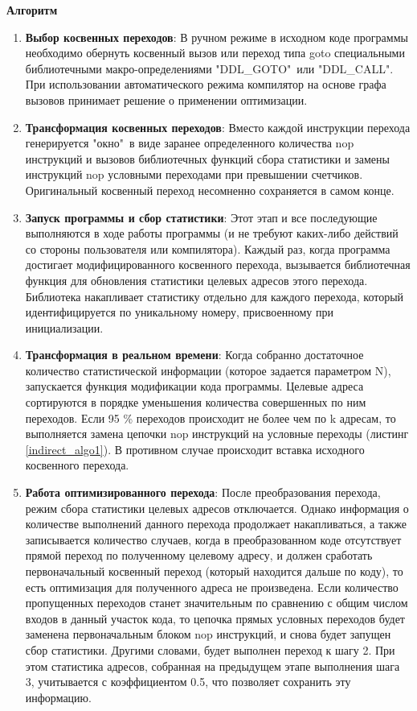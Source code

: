 \textbf{Алгоритм}
 \begin{enumerate}
 	\item \textbf{Выбор косвенных переходов}: В ручном режиме в исходном коде программы  необходимо обернуть косвенный вызов или переход типа goto специальными библиотечными макро-определениями "DDL\_GOTO"\  или "DDL\_CALL". При использовании автоматического режима компилятор на основе графа вызовов принимает решение о применении оптимизации. 
 	\item \textbf{Трансформация косвенных переходов}: Вместо каждой инструкции перехода генерируется "окно"\  в виде заранее определенного количества nop инструкций и вызовов библиотечных функций сбора статистики и замены инструкций nop условными переходами при превышении счетчиков. Оригинальный косвенный переход несомненно сохраняется в самом конце.
 	\item \textbf{Запуск программы и сбор статистики}: Этот этап и все последующие  выполняются в ходе работы программы (и не требуют каких-либо действий со стороны пользователя или компилятора). Каждый раз, когда программа достигает модифицированного косвенного перехода, вызывается библиотечная функция для обновления статистики целевых адресов этого перехода. Библиотека  накапливает статистику отдельно для каждого перехода, который идентифицируется по уникальному номеру, присвоенному при инициализации.
 	\item \textbf{Трансформация в реальном времени}: Когда собранно достаточное количество статистической информации (которое задается параметром N), запускается функция модификации кода программы. Целевые адреса сортируются в порядке уменьшения количества совершенных по ним переходов. Если 95 \% переходов происходит не более чем по k адресам, то выполняется замена цепочки nop инструкций на условные переходы (листинг \ref{indirect_algo1}). В противном случае происходит вставка исходного косвенного перехода.
	\item \textbf{Работа оптимизированного перехода}: После преобразования перехода, режим сбора статистики целевых адресов отключается. Однако информация о количестве выполнений данного перехода продолжает накапливаться, а также записывается количество случаев, когда в преобразованном коде отсутствует прямой переход по полученному целевому адресу, и должен сработать первоначальный косвенный переход (который находится дальше по коду), то есть оптимизация для полученного адреса не произведена. Если количество пропущенных переходов станет значительным по сравнению с общим числом входов в данный участок кода, то цепочка прямых условных переходов будет заменена первоначальным блоком nop инструкций, и снова будет запущен сбор статистики. Другими словами, будет выполнен переход к шагу 2. При этом статистика адресов, собранная на предыдущем этапе выполнения шага 3, учитывается с коэффициентом 0.5, что позволяет сохранить эту информацию.
 \end{enumerate}

